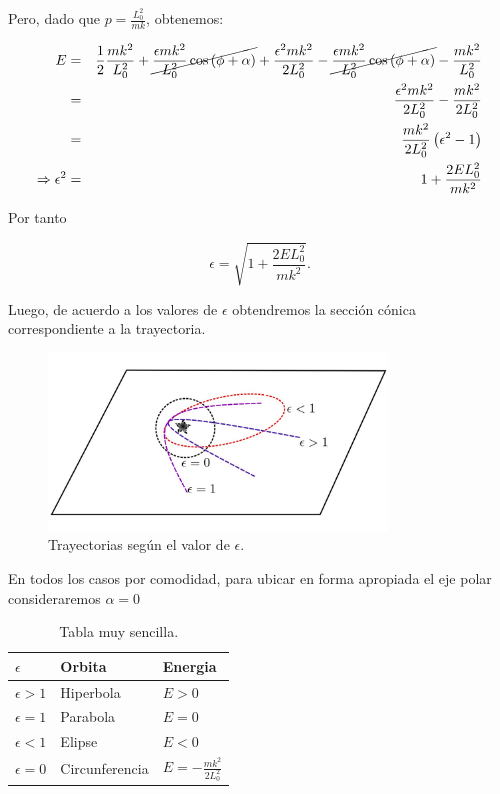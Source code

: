 \documentclass[12pt]{report}
\begin{document}
Pero, dado que $p=\displaystyle \frac{L_0^2}{mk}$, obtenemos:

\begin{eqnarray}
E&=&\frac{1}{2} \frac{mk^2}{L_0^2} + \cancel{\frac{\epsilon m k^2}{L_0^2} \cos{(\phi + \alpha)}} + \frac{\epsilon^2mk^2}{2L_0^2} - \cancel{\frac{\epsilon m k^2}{L_0^2} \cos{(\phi + \alpha)}} - \frac{mk^2}{L_0^2} \\
&=& \frac{\epsilon^2 m k^2}{2L_0^2} - \frac{ m k^2}{2L_0^2} \\
&=& \frac{ m k^2}{2L_0^2} \left( \epsilon^2 -1 \right) \\
\Rightarrow \epsilon^2 &=& 1 + \frac{2 E L_0^2}{mk^2} \\
\end{eqnarray}

Por tanto

\begin{equation}
\epsilon = \sqrt{1 + \frac{2 E L_0^2}{mk^2}}.
\end{equation}


Luego, de acuerdo a los valores de $\epsilon$ obtendremos la sección cónica correspondiente a la trayectoria. 


\begin{figure}[H]
	\begin{center}
	\includegraphics[width=9cm]{figura14.png} 
	\caption{ Trayectorias según el valor de $\epsilon$.}
	\label{fig.1}
	\end{center}
\end{figure}


En todos los casos por comodidad, para ubicar en forma apropiada el eje polar consideraremos $\alpha=0$



\begin{table}[htbp]
\begin{center}
\begin{tabular}{|l|l|l|}
\hline
$\epsilon$& Orbita & Energia\\
\hline \hline
$\epsilon > 1$ & Hiperbola & $E>0$ \\ \hline
$\epsilon = 1$ & Parabola & $E=0$ \\ \hline
$\epsilon < 1$ & Elipse & $E<0$ \\ \hline
$\epsilon=0$   & Circunferencia & $E= \displaystyle -\frac{mk^2}{2L_0^2}$ \\ \hline
\end{tabular}
\caption{Tabla muy sencilla.}
\label{tabla:sencilla}
\end{center}
\end{table}
\end{document}
